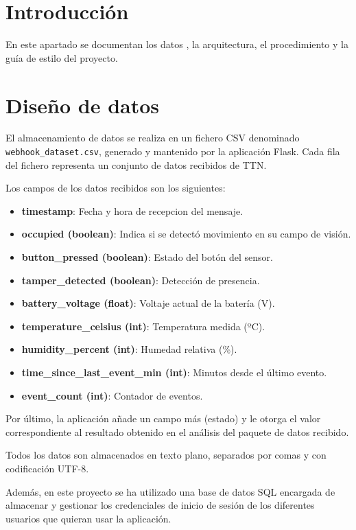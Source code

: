 
\section{Introducción}
En este apartado se documentan los datos , la arquitectura, el procedimiento y la guía de estilo del proyecto.
\section{Diseño de datos}

El almacenamiento de datos se realiza en un fichero CSV denominado \texttt{webhook\_dataset.csv}, generado y mantenido por la aplicación Flask. Cada fila del fichero representa un conjunto de datos recibidos de TTN.

Los campos de los datos recibidos son los siguientes:

\begin{itemize}
    \item \textbf{timestamp}: Fecha y hora de recepcion del mensaje.
    \item \textbf{occupied (boolean)}: Indica si se detectó movimiento en su campo de visión.
    \item \textbf{button\_pressed (boolean)}: Estado del botón del sensor.
    \item \textbf{tamper\_detected (boolean)}: Detección de presencia.
    \item \textbf{battery\_voltage (float)}: Voltaje actual de la batería (V).
    \item \textbf{temperature\_celsius (int)}: Temperatura medida (ºC).
    \item \textbf{humidity\_percent (int)}: Humedad relativa (\%).
    \item \textbf{time\_since\_last\_event\_min (int)}: Minutos desde el último evento.
    \item \textbf{event\_count (int)}: Contador de eventos.
\end{itemize}

Por último, la aplicación añade un campo más (estado) y le otorga el valor correspondiente al resultado obtenido en el análisis del paquete de datos recibido.

Todos los datos son almacenados en texto plano, separados por comas y con codificación UTF-8.

Además, en este proyecto se ha utilizado una base de datos SQL encargada de almacenar y gestionar los credenciales de inicio de sesión de los diferentes usuarios que quieran usar la aplicación.

